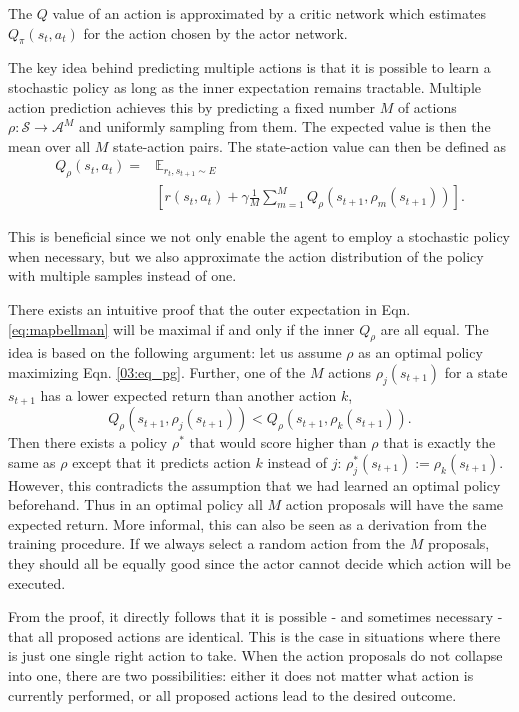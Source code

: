 The $Q$ value of an action is approximated by a critic network which estimates $Q_\pi(s_t,a_t)$ for the action chosen by the actor network.

The key idea behind predicting multiple actions is that it is possible to learn a stochastic policy as long as the inner expectation remains tractable. Multiple action prediction achieves this by predicting a fixed number $M$ of actions $\rho: \mathcal{S}\rightarrow\mathcal{A}^M$ and uniformly sampling from them. The expected value is then the mean over all $M$ state-action pairs. The state-action value can then be defined as
\begin{align}
 Q_\rho(s_t,a_t) = & \mathbb{E}_{r_t,s_{t+1}\sim E} \nonumber \\&  \left[r(s_t,a_t) + \gamma \frac{1}{M} \sum_{m=1}^M Q_\rho(s_{t+1},\rho_m(s_{t+1}))\right].
 \label{eq:mapbellman}
\end{align}

This is beneficial since we not only enable the agent to employ a stochastic policy when necessary, but we also approximate the action distribution of the policy with multiple samples instead of one. 

There exists an intuitive proof that the outer expectation in Eqn. \ref{eq:mapbellman} will be maximal if and only if the inner $Q_\rho$ are all equal. The idea is based on the following argument: let us assume $\rho$ as an optimal policy maximizing Eqn. \ref{03:eq_pg}. Further, one of the $M$ actions $\rho_j(s_{t+1})$  for a state $s_{t+1}$ has a lower expected return than another action $k$,
\begin{equation}\label{key}
Q_\rho(s_{t+1},\rho_j(s_{t+1})) < Q_\rho(s_{t+1},\rho_k(s_{t+1})).
\end{equation} 
Then there exists a policy $\rho^*$ that would score higher than $\rho$ that is exactly the same as $\rho$ except that it predicts action $k$ instead of $j$: $\rho^*_j(s_{t+1}) := \rho_k(s_{t+1})$. However, this contradicts the assumption that we had learned an optimal policy beforehand. Thus in an optimal policy all $M$ action proposals will have the same expected return. 
More informal, this can also be seen as a derivation from the training procedure. If we always select a random action from the $M$ proposals, they should all be equally good since the actor cannot decide which action will be executed.

From the proof, it directly follows that it is possible - and sometimes necessary - that all proposed actions are identical. This is the case in situations where there is just one single right action to take. When the action proposals do not collapse into one, there are two possibilities: either it does not matter what action is currently performed, or all proposed actions lead to the desired outcome. 

